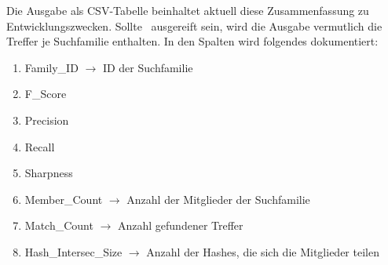 \begin{enumerate}[a)]
                Die Ausgabe als \ac{CSV}-Tabelle beinhaltet aktuell diese Zusammenfassung zu Entwicklungszwecken. Sollte \protfin\ ausgereift sein, wird die Ausgabe vermutlich die Treffer je Suchfamilie enthalten. In den Spalten wird folgendes dokumentiert:
                \begin{enumerate}[1.]
                    \item Family\_ID $\rightarrow$ ID der Suchfamilie
                    \item F\_Score
                    \item Precision
                    \item Recall
                    \item Sharpness 
                    \item Member\_Count $\rightarrow$ Anzahl der Mitglieder der Suchfamilie
                    \item Match\_Count $\rightarrow$ Anzahl gefundener Treffer
                    \item Hash\_Intersec\_Size $\rightarrow$ Anzahl der Hashes, die sich die Mitglieder teilen
                \end{enumerate}
        \end{enumerate}

